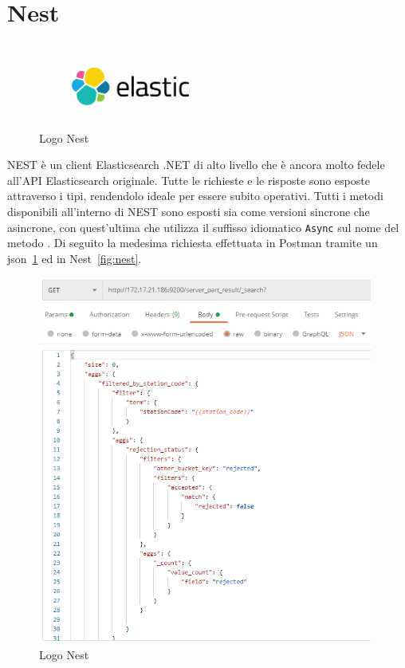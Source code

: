 \section{Nest}
\begin{figure}[ht!]
\begin{center}
  \includegraphics[width=6cm]{images/elastic.png}
  \caption{Logo Nest}
\end{center}
\end{figure}
NEST è un client Elasticsearch .NET di alto livello che è ancora molto fedele all'API Elasticsearch originale. Tutte le richieste e le risposte sono esposte attraverso i tipi, rendendolo ideale per essere subito operativi.
Tutti i metodi disponibili all'interno di NEST sono esposti sia come versioni sincrone che asincrone, con quest'ultima che utilizza il suffisso idiomatico \verb|Async| sul nome del metodo \cite{Nest}.
Di seguito la medesima richiesta effettuata in Postman tramite un json~\ref{fig:json} ed in Nest~\ref{fig:nest}.
\pagebreak
\begin{figure}[ht!]
\begin{center}
  \includegraphics[width=11cm]{images/json.png}
  \caption{Logo Nest}
  \label{fig:json}
\end{center}
\end{figure}
